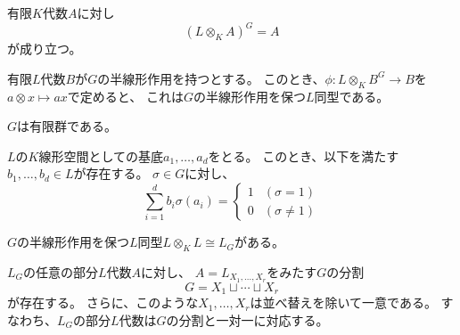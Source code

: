%

\chapter{}

\begin{theorem}\label{Galois-descent1}
    有限$K$代数$A$に対し
    $$
    (L\otimes_K A)^G=A
    $$
    が成り立つ。
\end{theorem}

\begin{theorem}\label{Galois-descent2}
    有限$L$代数$B$が$G$の半線形作用を持つとする。
    このとき、$\phi:L\otimes_KB^G\to B$を$a\otimes x\mapsto ax$で定めると、
    これは$G$の半線形作用を保つ$L$同型である。
\end{theorem}

\begin{lemma}\label{finite}
    $G$は有限群である。
\end{lemma}

\begin{lemma}\label{basis}
    $L$の$K$線形空間としての基底$a_1,\ldots,a_d$をとる。
    このとき、以下を満たす$b_1,\ldots,b_d\in L$が存在する。
    $\sigma\in G$に対し、
    $$
    \sum_{i=1}^db_i\sigma(a_i)=
    \begin{cases}
        1 & (\sigma=1)\\
        0 & (\sigma\neq 1)
    \end{cases}
    $$
\end{lemma}

\begin{proposition}\label{ext-self}
    $G$の半線形作用を保つ$L$同型$L\otimes_KL\cong L_G$がある。
\end{proposition}

\begin{proposition}\label{subalgebra-decomp}
    $L_G$の任意の部分$L$代数$A$に対し、
    $A=L_{X_1,\ldots,X_r}$をみたす$G$の分割$$G=X_1\sqcup \cdots\sqcup X_r$$が存在する。
    さらに、このような$X_1,\ldots,X_r$は並べ替えを除いて一意である。
    すなわち、$L_G$の部分$L$代数は$G$の分割と一対一に対応する。
\end{proposition}

